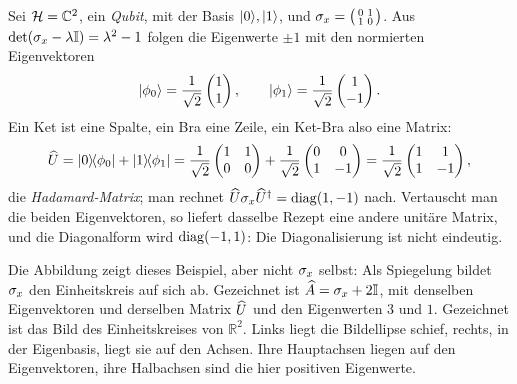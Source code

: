 \begin{beispiel}
	Sei $\mathcal{H} = \mathbb{C}^2$, ein \emph{Qubit}, mit der Basis $\lvert 0 \rangle,\lvert 1 \rangle$, und $\sigma_{x} = \bigl(\begin{smallmatrix} 0 & 1 \\ 1 & 0\end{smallmatrix}\bigr)$. Aus $\det(\sigma_{x} - \lambda\mathbb{I}) = \lambda^2 - 1$ folgen die Eigenwerte $\pm 1$ mit den normierten Eigenvektoren
	\begin{equation}
		\lvert \phi_0 \rangle = \frac{1}{\sqrt{2}}\begin{pmatrix} 1 \\ 1 \end{pmatrix}, \qquad \lvert \phi_1 \rangle = \frac{1}{\sqrt{2}}\begin{pmatrix} 1 \\ -1 \end{pmatrix}.
	\end{equation}
	Ein Ket ist eine Spalte, ein Bra eine Zeile, ein Ket-Bra also eine Matrix:
	\begin{equation}
		\widehat{U} = \lvert 0 \rangle\!\langle \phi_0 \rvert + \lvert 1 \rangle\!\langle \phi_1 \rvert = \frac{1}{\sqrt{2}}\begin{pmatrix} 1 & 1 \\ 0 & 0 \end{pmatrix} + \frac{1}{\sqrt{2}}\begin{pmatrix} 0 & 0 \\ 1 & -1 \end{pmatrix} = \frac{1}{\sqrt{2}}\begin{pmatrix} 1 & 1 \\ 1 & -1 \end{pmatrix},
	\end{equation}
	die \emph{Hadamard-Matrix}; man rechnet $\widehat{U}\sigma_{x}\widehat{U}^{\dagger} = \operatorname{diag}(1,-1)$ nach. Vertauscht man die beiden Eigenvektoren, so liefert dasselbe Rezept eine andere unitäre Matrix, und die Diagonalform wird $\operatorname{diag}(-1,1)$: Die Diagonalisierung ist nicht eindeutig.
\end{beispiel}



Die Abbildung zeigt dieses Beispiel, aber nicht $\sigma_{x}$ selbst: Als Spiegelung bildet $\sigma_{x}$ den Einheitskreis auf sich ab. Gezeichnet ist $\widehat{A} = \sigma_{x} + 2\mathbb{I}$, mit denselben Eigenvektoren und derselben Matrix $\widehat{U}$ und den Eigenwerten $3$ und $1$. Gezeichnet ist das Bild des Einheitskreises von $\mathbb{R}^2$. Links liegt die Bildellipse schief, rechts, in der Eigenbasis, liegt sie auf den Achsen. Ihre Hauptachsen liegen auf den Eigenvektoren, ihre Halbachsen sind die hier positiven Eigenwerte.


